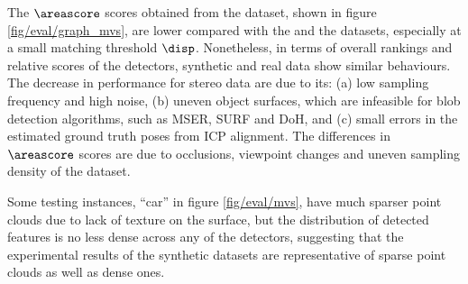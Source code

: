 The $\areascore$ scores obtained from the \stereoset dataset, shown in figure \ref{fig/eval/graph_mvs}, are lower compared with the \meshset and the \mriset datasets, especially at a small matching threshold $\disp$. Nonetheless, in terms of overall rankings and relative scores of the detectors, synthetic and real data show similar behaviours. The decrease in performance for stereo data are due to its: (a) low sampling frequency and high noise, (b) uneven object surfaces, which are infeasible for blob detection algorithms, such as MSER, SURF and DoH, and (c) small errors in the estimated ground truth poses from ICP alignment.
The differences in $\areascore$ scores are due to occlusions, viewpoint changes and uneven sampling density of the \stereoset dataset. 

Some testing instances, \eg ``car'' in figure \ref{fig/eval/mvs}, have much sparser point clouds due to lack of texture on the surface, but the distribution of detected features is no less dense across any of the detectors, suggesting that the experimental results of the synthetic datasets are representative of sparse point clouds as well as dense ones.

